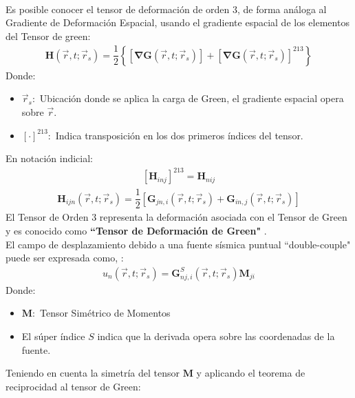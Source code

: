 \documentclass{beamer}
\begin{document}
\begin{frame}[allowframebreaks]
\begin{align*}
\end{align*}
%
Es posible conocer el tensor de deformación de orden $3$, de forma análoga al Gradiente de Deformación Espacial, usando el gradiente espacial de los elementos del Tensor de green:
%
\begin{align*}
	\mathbf{H} \left( \vec{r}, t;\vec{r}_s \right) = \dfrac{1}{2} \left\lbrace \left[ \mathbf{\nabla G} \left(\vec{r}, t; \vec{r}_s \right) \right] + \left[ \mathbf{\nabla G} \left( \vec{r}, t; \vec{r}_s \right) \right]^{213} \right\rbrace
\end{align*}
%
Donde:
%
\begin{itemize}
%
	\justifying
	\item $\vec{r}_s:$ Ubicación donde se aplica la carga de Green, el gradiente espacial opera sobre $\vec{r}$.
	\item $\left[  \cdot \right]^{213}:$ Indica transposición en los dos primeros índices del tensor.
%
\end{itemize}
%
En notación indicial:
%
\begin{align*}
\left[ \mathbf{H}_{inj} \right]^{213} = \mathbf{H}_{nij}
\end{align*}
%
\begin{align*}
	\mathbf{H}_{ijn} \left( \vec{r}, t; \vec{r}_s \right) = \dfrac{1}{2} \left[ \mathbf{G}_{jn,i} \left( \vec{r}, t; \vec{r}_s \right) + \mathbf{G}_{in,j} \left( \vec{r}, t; \vec{r}_s \right) \right]
\end{align*}
%
\justifying
El Tensor de Orden $3$ representa la deformación asociada con el Tensor de Green y es conocido como \textbf{``Tensor de Deformación de Green"} \cite{zhaogreen}.\\
%
El campo de desplazamiento debido a una fuente sísmica puntual ``double-couple" puede ser expresada como, \cite{book:aki}:
%
\begin{align*}
	u_n \left( \vec{r}, t; \vec{r}_s \right) = \mathbf{G}_{nj,i}^S \left( \vec{r}, t; \vec{r}_s \right) \mathbf{M}_{ji}
\end{align*}
%
Donde:
%
\begin{itemize}
	\justifying
	\item $\mathbf{M}:$ Tensor Simétrico de Momentos
	\item El súper índice $S$ indica que la derivada opera sobre las coordenadas de la fuente.
\end{itemize}
%
\justifying
Teniendo en cuenta la simetría del tensor $\mathbf{M}$ y aplicando el teorema de reciprocidad al tensor de Green:
%
\begin{align*}

\end{align*}
\end{frame}
\end{document}

